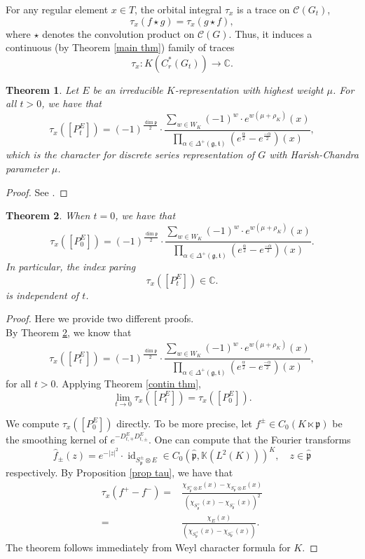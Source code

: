 \documentclass{amsproc}
\newtheorem{theorem}{Theorem}[section]
\theoremstyle{definition}
\theoremstyle{remark}
\numberwithin{equation}{section}
\DeclareMathOperator{\id}{id}
\newcommand{\kg}{\mathfrak{g}}
\newcommand{\kp}{\mathfrak{p}}
\newcommand{\kt}{\mathfrak{t}}
\newcommand{\bK}{\mathbb{K}}
\begin{document}
For any regular element $x \in T$, the orbital integral $\tau_x$ is a trace on $\mathcal{C}(G_t)$, 
\[
\tau_x(f \star g) = \tau_x (g \star f),
\]
where $\star$ denotes the convolution product on $\mathcal{C}(G)$. Thus, it induces a continuous (by Theorem \ref{main thm}) family of traces
\[
\tau_x \colon K(C^*_r(G_t)) \to \mathbb{C}. 
\]

\begin{theorem}
Let $E$ be an irreducible $K$-representation with highest weight $\mu$. For all $t >0$, we have that 
\[
\tau_x \left([P^E_t]\right)  = (-1)^{\frac{\dim \kp}{2}} \cdot \frac{\sum_{w \in W_K} (-1)^w \cdot e^{w(\mu + \rho_K)}(x)}{\prod_{\alpha \in \Delta^+(\kg, \kt)}\left( e^{\frac{\alpha}{2}} - e^{\frac{-\alpha}{2}} \right)(x)},
\]	
which is the character for discrete series representation of $G$ with Harish-Chandra parameter $\mu$. 
\end{theorem}

\begin{proof}
See \cite[Theorem 3.1]{HW}. 	
\end{proof}


\begin{theorem}
\label{t0 thm}
When $t = 0$, we have that 
\[
\tau_x \left([P^E_0]\right)  = (-1)^{\frac{\dim \kp}{2}} \cdot \frac{\sum_{w \in W_K} (-1)^w \cdot e^{w(\mu + \rho_K)}(x)}{\prod_{\alpha \in \Delta^+(\kg, \kt)}\left( e^{\frac{\alpha}{2}} - e^{\frac{-\alpha}{2}} \right)(x)}.
\]	
In particular, the index paring 
\[
\tau_x \left([P^E_t]\right)  \in \mathbb{C} .
\]
is independent of $t$. 
\end{theorem}

\begin{proof} Here we provide two different proofs. \\

 By Theorem \ref{t0 thm}, we know that 
\[
\tau_x \left([P^E_t]\right)  = (-1)^{\frac{\dim \kp}{2}} \cdot \frac{\sum_{w \in W_K} (-1)^w \cdot e^{w(\mu + \rho_K)}(x)}{\prod_{\alpha \in \Delta^+(\kg, \kt)}\left( e^{\frac{\alpha}{2}} - e^{\frac{-\alpha}{2}} \right)(x)},
\]
for all $t >0$. Applying Theorem \ref{contin thm}, 
\[
\lim_{t\to 0}\tau_x \left([P^E_t]\right) = \tau_x \left([P^E_0]\right).
\]

 We compute $\tau_x \left([P^E_0]\right)$ directly. To be more precise, let $f^\pm \in C_0(K \ltimes \kp)$ be the smoothing kernel of $e^{-D^{E}_{t,\mp}D^{E}_{t,\pm}}$. One can compute that the Fourier transforms
\[
\widehat{f}_\pm(z) = e^{-|z|^2} \cdot \id_{S^\pm_\kp\otimes E} \in  C_0\left(\widehat{\kp}, \bK \left(L^2(K)\right) \right)^K, \quad z \in \widehat{\kp}
\]
respectively. By Proposition \ref{prop tau},  we have that 
\[
\begin{aligned}
\tau_x(f^+-f^-)  = &	\frac{\chi_{S_\kp^+\otimes E}(x) - \chi_{S_\kp^-\otimes E}(x) }{\left(\chi_{S_\kp^+}(x) -\chi_{S_\kp^-}(x) \right)^2}\\
=&\frac{\chi_E(x)}{\left(\chi_{S_\kp^+}(x) -\chi_{S_\kp^-}(x) \right)}.
\end{aligned}
\]
The theorem follows immediately from Weyl character formula for $K$. 

\end{proof}
\end{document}
